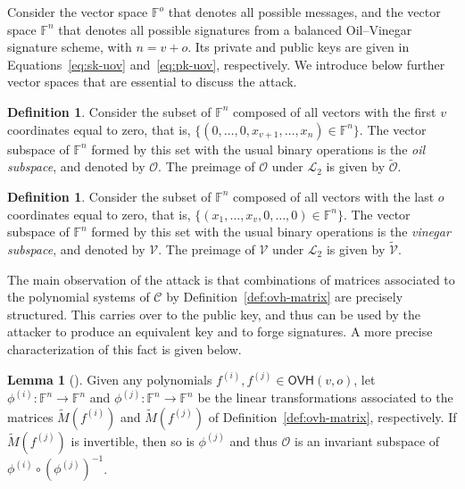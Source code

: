 \documentclass[12pt, a4paper, oneside]{memoir}
\theoremstyle{definition}
\newtheorem{definition}[theorem]{Definition}
\newtheorem{lemma}[theorem]{Lemma}
\begin{document}
Consider the vector space $\mathbb{F}^{o}$ that denotes all possible messages, and the vector space $\mathbb{F}^{n}$ that denotes all possible signatures from a balanced Oil--Vinegar signature scheme, with $n = v + o$. Its private and public keys are given in Equations~\ref{eq:sk-uov} and~\ref{eq:pk-uov}, respectively. We introduce below further vector spaces that are essential to discuss the attack.

\begin{definition}\label{def:oil-subspace}
  Consider the subset of $\mathbb{F}^{n}$ composed of all vectors with the first $v$ coordinates equal to zero, that is, $\{ (0, \dots, 0, x_{v + 1}, \dots, x_{n}) \in \mathbb{F}^{n} \}$. The vector subspace of $\mathbb{F}^{n}$ formed by this set with the usual binary operations is the \emph{oil subspace}, and denoted by $\mathcal{O}$. The preimage of $\mathcal{O}$ under $\mathcal{L}_{2}$ is given by $\widetilde{\mathcal{O}}$.
\end{definition}

\begin{definition}
  Consider the subset of $\mathbb{F}^{n}$ composed of all vectors with the last $o$ coordinates equal to zero, that is, $\{ (x_{1}, \dots, x_{v}, 0, \dots, 0) \in \mathbb{F}^{n} \}$. The vector subspace of $\mathbb{F}^{n}$ formed by this set with the usual binary operations is the \emph{vinegar subspace}, and denoted by $\mathcal{V}$. The preimage of $\mathcal{V}$ under $\mathcal{L}_{2}$ is given by $\widetilde{\mathcal{V}}$.
\end{definition}

The main observation of the attack is that combinations of matrices associated to the polynomial systems of $\mathcal{C}$ by Definition~\ref{def:ovh-matrix} are precisely structured. This carries over to the public key, and thus can be used by the attacker to produce an equivalent key and to forge signatures. A more precise characterization of this fact is given below.

\begin{lemma}[{\cite[Lemma~1]{Kipnis:199904}}]
  Given any polynomials $f^{(i)}, f^{(j)} \in \textsf{OVH}(v, o)$, let $\phi^{(i)} : \mathbb{F}^{n} \to \mathbb{F}^{n}$ and $\phi^{(j)} : \mathbb{F}^{n} \to \mathbb{F}^{n}$ be the linear transformations associated to the matrices $\widetilde{M}(f^{(i)})$ and $\widetilde{M}(f^{(j)})$ of Definition~\ref{def:ovh-matrix}, respectively. If $\widetilde{M}(f^{(j)})$ is invertible, then so is $\phi^{(j)}$ and thus $\mathcal{O}$ is an invariant subspace of $\phi^{(i)} \circ (\phi^{(j)})^{-1}$.
\end{lemma}
\end{document}
